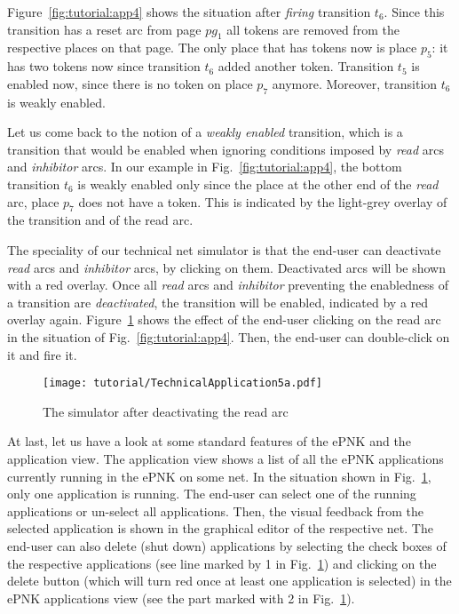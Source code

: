 Figure~\ref{fig:tutorial:app4} shows the situation after \emph{firing}
transition $t_6$. Since this transition has a reset arc from page $pg_1$
all tokens are removed from the respective places on that page. The only
place that has tokens now is place $p_5$: it has two tokens now since
transition $t_6$ added another token.  Transition $t_5$ is enabled now,
since there is no token on place $p_7$ anymore. Moreover, transition $t_6$ is
weakly enabled.


Let us come back to the notion of a \emph{weakly enabled} transition, which is
a transition that would be enabled when ignoring conditions imposed by
\emph{read} arcs and \emph{inhibitor} arcs. In our example in Fig.~\ref{fig:tutorial:app4},
the bottom transition $t_6$ is weakly enabled only since the place at the
other end of the \emph{read} arc, place $p_7$ does not have a token. This
is indicated by the light-grey overlay of the transition and of the read arc.

The speciality of our technical net simulator is that the end-user can
deactivate \emph{read} arcs and \emph{inhibitor} arcs, by clicking on them.
Deactivated arcs will be shown with a red overlay. Once all \emph{read} arcs and
\emph{inhibitor} preventing the enabledness of a transition are
\emph{deactivated}, the transition will be enabled, indicated by a red overlay
again. Figure~\ref{fig:tutorial:app5} shows the effect of the end-user clicking
on the read arc in the situation of Fig.~\ref{fig:tutorial:app4}.
Then, the end-user can double-click on it and fire it.

\begin{figure}[hbtp!!]
  \centerline{\texttt{[image: tutorial/TechnicalApplication5a.pdf]}}
  \caption{The simulator after deactivating the read arc}
  \label{fig:tutorial:app5}
\end{figure}

At last, let us have a look at some standard features of the ePNK and the
application view. The application view shows a list of all the ePNK applications currently
running in the ePNK on some net. In the situation shown in
Fig.~\ref{fig:tutorial:app5}, only one application is running. The end-user can
select one of the running applications or un-select all applications. Then, the
visual feedback from the selected application is shown in the graphical editor
of the respective net. The end-user can also delete (shut down) applications
by selecting the check boxes of the respective applications (see line marked by
1 in Fig.~\ref{fig:tutorial:app5}) and clicking on the delete button (which
 will turn red once at least one application is selected) in the ePNK
 applications view (see the part marked with 2 in Fig.~\ref{fig:tutorial:app5}).


